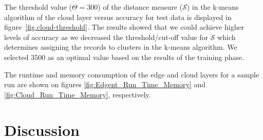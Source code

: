 \documentclass[letterpaper]{article}
\begin{document}
The threshold value (\(\Theta = 300\)) of the distance measure (\(\mathcal{S}\)) in the k-means algorithm of the cloud layer versus accuracy for test data is displayed in figure~\ref{fig.cloud-threshold}. The results showed that we could achieve higher levels of accuracy as we decreased the threshold/cut-off value for \(\mathcal{S}\) which determines assigning the records to clusters in the k-means algorithm. We selected \(3500\) as an optimal value based on the results of the training phase.

The runtime and memory consumption of the edge and cloud layers for a sample run are shown on figures \ref{fig:Edgent_Run_Time_Memory} and \ref{fig:Cloud_Run_Time_Memory}, respectively.

\section{Discussion}





\end{document}
